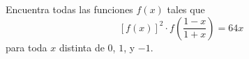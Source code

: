 Encuentra todas las funciones $f(x)$ tales que 
\[[f(x)]^2\cdot f\left(\frac{1-x}{1+x}\right)=64x\]
para toda $x$ distinta de $0$, $1$, y $-1$.
